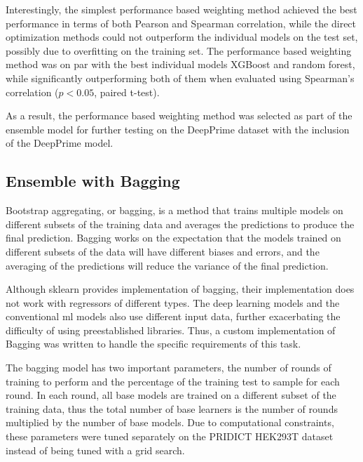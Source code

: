 Interestingly, the simplest performance based weighting method achieved the best performance in terms of both Pearson and Spearman correlation, while the direct optimization methods could not outperform the individual models on the test set, possibly due to overfitting on the training set. The performance based weighting method was on par with the best individual models XGBoost and random forest, while significantly outperforming both of them when evaluated using Spearman's correlation ($p<0.05$, paired t-test). 

As a result, the performance based weighting method was selected as part of the ensemble model for further testing on the DeepPrime dataset with the inclusion of the DeepPrime model.

\subsection{Ensemble with Bagging}

Bootstrap aggregating, or bagging, is a method that trains multiple models on different subsets of the training data and averages the predictions to produce the final prediction. Bagging works on the expectation that the models trained on different subsets of the data will have different biases and errors, and the averaging of the predictions will reduce the variance of the final prediction\cite{dongSurveyEnsembleLearning2020}.

Although sklearn provides implementation of bagging, their implementation does not work with regressors of different types. The deep learning models and the conventional ml models also use different input data, further exacerbating the difficulty of using preestablished libraries. Thus, a custom implementation of Bagging was written to handle the specific requirements of this task.

The bagging model has two important parameters, the number of rounds of training to perform and the percentage of the training test to sample for each round. In each round, all base models are trained on a different subset of the training data, thus the total number of base learners is the number of rounds multiplied by the number of base models. Due to computational constraints, these parameters were tuned separately on the PRIDICT HEK293T dataset instead of being tuned with a grid search. 

